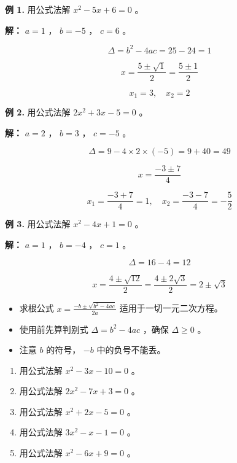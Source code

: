 \begin{workedexamples}


\textbf{例 1.} 用公式法解 $x^2 - 5x + 6 = 0$ 。

\textbf{解：} $a = 1$ ， $b = -5$ ， $c = 6$ 。

\[
\Delta = b^2 - 4ac = 25 - 24 = 1
\]


\[
x = \frac{5 \pm \sqrt{1}}{2} = \frac{5 \pm 1}{2}
\]


\[
x_1 = 3, \quad x_2 = 2
\]


\textbf{例 2.} 用公式法解 $2x^2 + 3x - 5 = 0$ 。

\textbf{解：} $a = 2$ ， $b = 3$ ， $c = -5$ 。

\[
\Delta = 9 - 4 \times 2 \times (-5) = 9 + 40 = 49
\]


\[
x = \frac{-3 \pm 7}{4}
\]


\[
x_1 = \frac{-3 + 7}{4} = 1, \quad x_2 = \frac{-3 - 7}{4} = -\frac{5}{2}
\]


\textbf{例 3.} 用公式法解 $x^2 - 4x + 1 = 0$ 。

\textbf{解：} $a = 1$ ， $b = -4$ ， $c = 1$ 。

\[
\Delta = 16 - 4 = 12
\]


\[
x = \frac{4 \pm \sqrt{12}}{2} = \frac{4 \pm 2\sqrt{3}}{2} = 2 \pm \sqrt{3}
\]


\end{workedexamples}

\begin{keytakeaway}


\begin{itemize}
  \item 求根公式 $x = \frac{-b \pm \sqrt{b^2 - 4ac}}{2a}$ 适用于一切一元二次方程。
  \item 使用前先算判别式 $\Delta = b^2 - 4ac$ ，确保 $\Delta \geq 0$ 。
  \item 注意 $b$ 的符号， $-b$ 中的负号不能丢。
\end{itemize}


\end{keytakeaway}

\begin{practice}


\begin{enumerate}
  \item 用公式法解 $x^2 - 3x - 10 = 0$ 。
  \item 用公式法解 $2x^2 - 7x + 3 = 0$ 。
  \item 用公式法解 $x^2 + 2x - 5 = 0$ 。
  \item 用公式法解 $3x^2 - x - 1 = 0$ 。
  \item 用公式法解 $x^2 - 6x + 9 = 0$ 。
\end{enumerate}


\end{practice}

